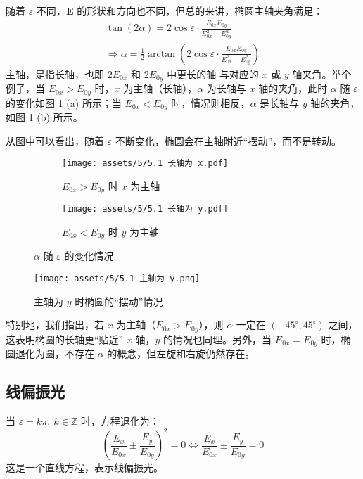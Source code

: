 \documentclass[UTF8]{report}
\def\Z{\mathbb{Z}}
\theoremstyle{MyLineTheoremStyle} %
\theoremstyle{MyBlockTheoremStyle} %
\theoremstyle{MySubsubsectionStyle} %
\begin{document}
随着 $\varepsilon$ 不同，$\boldsymbol{E}$ 的形状和方向也不同，但总的来讲，椭圆主轴夹角满足：
\begin{gather}
\tan \left(2 \alpha\right) = 2 \cos \varepsilon \cdot \frac{E_{0x}E_{0y}}{E_{0x}^2 - E_{0y}^2} \\ 
\Longrightarrow \alpha = \frac{1}{2} \arctan \left(2 \cos \varepsilon \cdot \frac{E_{0x}E_{0y}}{E_{0x}^2 - E_{0y}^2}\right)
\end{gather}
主轴，是指长轴，也即 $2E_{0x}$ 和 $2E_{0y}$ 中更长的轴{\color{red} 与对应的 $x$ 或 $y$ 轴夹角}。举个例子，当 $E_{0x} > E_{0y}$ 时，$x$ 为主轴（长轴），$\alpha$ 为长轴与 $x$ 轴的夹角，此时 $\alpha$ 随 $\varepsilon$ 的变化如图 \ref{fig:alpha} (a) 所示；当 $E_{0x} < E_{0y}$ 时，情况则相反，$\alpha$ 是长轴与 $y$ 轴的夹角，如图 \ref{fig:alpha} (b) 所示。

从图中可以看出，随着 $\varepsilon$ 不断变化，椭圆会在主轴附近“摆动”，而不是转动。
\begin{figure}[H]\centering
\begin{subfigure}[b]{0.5\columnwidth}\centering
    \texttt{[image: assets/5/5.1 长轴为 x.pdf]}
    \caption{$E_{0x} > E_{0y}$ 时 $x$ 为主轴}
\end{subfigure}\hfill
\begin{subfigure}[b]{0.5\columnwidth}\centering
    \texttt{[image: assets/5/5.1 长轴为 y.pdf]}
    \caption{$E_{0x} < E_{0y}$ 时 $y$ 为主轴}
\end{subfigure}
\caption{$\alpha$ 随 $\varepsilon$ 的变化情况}
\label{fig:alpha}
\end{figure}
\begin{figure}[H]\centering
    \texttt{[image: assets/5/5.1 主轴为 y.png]}
    \caption{主轴为 $y$ 时椭圆的“摆动”情况}
\end{figure}
特别地，我们指出，若 $x$ 为主轴（$E_{0x} > E_{0y}$），则 $\alpha$ 一定在 $(-45^\circ, 45^\circ)$ 之间，这表明椭圆的长轴更“贴近” $x$ 轴，$y$ 的情况也同理。另外，当 $E_{0x} = E_{0y}$ 时，椭圆退化为圆，不存在 $\alpha$ 的概念，但左旋和右旋仍然存在。

\subsection{线偏振光}
当 $\varepsilon = k \pi,\  k \in \Z$ 时，方程退化为：
\begin{equation}
\left( \frac{E_x}{E_{0x}} \pm \frac{E_y}{E_{0y}} \right)^2 = 0 \Longleftrightarrow \frac{E_x}{E_{0x}} \pm \frac{E_y}{E_{0y}} = 0
\end{equation}
这是一个直线方程，表示线偏振光。
\end{document}
